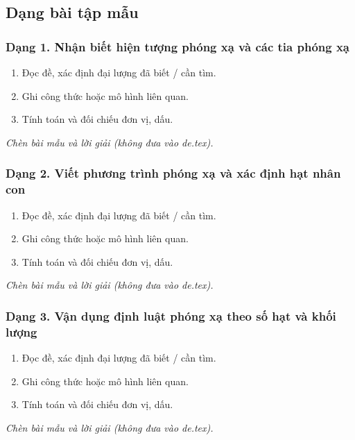 

\subsection{Dạng bài tập mẫu}
\subsubsection{Dạng 1. Nhận biết hiện tượng phóng xạ và các tia phóng xạ}
\begin{phuongphap}
\begin{enumerate}
\item Đọc đề, xác định đại lượng đã biết / cần tìm.
\item Ghi công thức hoặc mô hình liên quan.
\item Tính toán và đối chiếu đơn vị, dấu.
\end{enumerate}
\end{phuongphap}
\begin{vidumau}
\textit{Chèn bài mẫu và lời giải (không đưa vào de.tex).}
\end{vidumau}

\subsubsection{Dạng 2. Viết phương trình phóng xạ và xác định hạt nhân con}
\begin{phuongphap}
\begin{enumerate}
\item Đọc đề, xác định đại lượng đã biết / cần tìm.
\item Ghi công thức hoặc mô hình liên quan.
\item Tính toán và đối chiếu đơn vị, dấu.
\end{enumerate}
\end{phuongphap}
\begin{vidumau}
\textit{Chèn bài mẫu và lời giải (không đưa vào de.tex).}
\end{vidumau}

\subsubsection{Dạng 3. Vận dụng định luật phóng xạ theo số hạt và khối lượng}
\begin{phuongphap}
\begin{enumerate}
\item Đọc đề, xác định đại lượng đã biết / cần tìm.
\item Ghi công thức hoặc mô hình liên quan.
\item Tính toán và đối chiếu đơn vị, dấu.
\end{enumerate}
\end{phuongphap}
\begin{vidumau}
\textit{Chèn bài mẫu và lời giải (không đưa vào de.tex).}
\end{vidumau}

